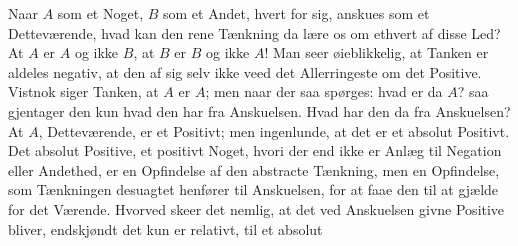 \documentclass[11pt]{book}
\begin{document}
Naar $A$ som et Noget, $B$ som et Andet, hvert for sig, anskues som
et Detteværende, hvad kan den rene Tænkning da lære os om ethvert af
disse Led? At $A$ er $A$ og ikke $B$, at $B$ er $B$ og ikke $A$! Man
seer øieblikkelig, at Tanken er aldeles negativ, at den af sig selv
ikke veed det Allerringeste om det Positive. Vistnok siger Tanken, at
$A$ er $A$; men naar der saa spørges: hvad er da $A$? saa gjentager
den kun hvad den har fra Anskuelsen. Hvad har den da fra Anskuelsen?
At $A$, Detteværende, er et Positivt; men ingenlunde, at det er et
absolut Positivt. Det absolut Positive, et positivt Noget, hvori der
end ikke er Anlæg til Negation eller Andethed, er en Opfindelse af
den abstracte Tænkning, men en Opfindelse, som Tænkningen desuagtet
henfører til Anskuelsen, for at faae den til at gjælde for det
Værende. Hvorved skeer det nemlig, at det ved Anskuelsen givne
Positive bliver, endskjøndt det kun er relativt, til et absolut
\end{document}
